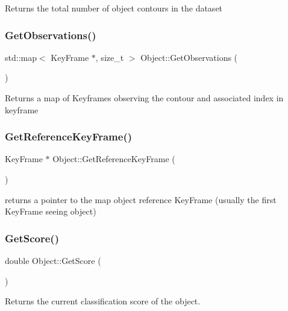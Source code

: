 Returns the total number of object contours in the dataset \mbox{\label{classObject_ab17d7f60abbec82a3b45fdf322ea472e}} 
\subsubsection{\texorpdfstring{Get\+Observations()}{GetObservations()}}
{\footnotesize\ttfamily std\+::map$<$ Key\+Frame $\ast$, size\+\_\+t $>$ Object\+::\+Get\+Observations (\begin{DoxyParamCaption}{ }\end{DoxyParamCaption})}

Returns a map of Keyframes observing the contour and associated index in keyframe \mbox{\label{classObject_a3513873d737b0557c12c47c19ae2c291}} 
\subsubsection{\texorpdfstring{Get\+Reference\+Key\+Frame()}{GetReferenceKeyFrame()}}
{\footnotesize\ttfamily Key\+Frame $\ast$ Object\+::\+Get\+Reference\+Key\+Frame (\begin{DoxyParamCaption}{ }\end{DoxyParamCaption})}

returns a pointer to the map object reference Key\+Frame (usually the first Key\+Frame seeing object) \mbox{\label{classObject_a440178c130d1b50d232d9b96510e45a6}} 
\subsubsection{\texorpdfstring{Get\+Score()}{GetScore()}}
{\footnotesize\ttfamily double Object\+::\+Get\+Score (\begin{DoxyParamCaption}{ }\end{DoxyParamCaption})}

Returns the current classification score of the object. \mbox{\label{classObject_ad4cb82b18bd457d631cb79cec0db98ac}} 
